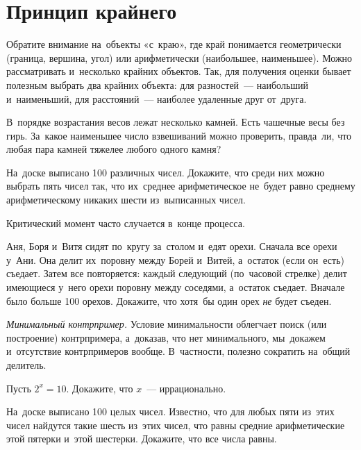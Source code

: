 
\section*{Принцип крайнего}



Обратите внимание на~объекты «с~краю», где край понимается геометрически
(граница, вершина, угол) или арифметически (наибольшее, наименьшее).
Можно рассматривать и~несколько крайних объектов.
Так, для получения оценки бывает полезным выбрать два крайних объекта: для
разностей~— наибольший и~наименьший, для расстояний~— наиболее удаленные
друг от~друга.

\begin{problems}

\item
В~порядке возрастания весов лежат несколько камней.
Есть чашечные весы без гирь.
За~какое наименьшее число взвешиваний можно проверить, правда~ли, что любая пара
камней тяжелее любого одного камня?

\item
На~доске выписано 100 различных чисел.
Докажите, что среди них можно выбрать пять чисел так, что их~среднее
арифметическое не~будет равно среднему арифметическому никаких шести
из~выписанных чисел.

\end{problems}

Критический момент часто случается в~конце процесса.

\begin{problems}

\item
Аня, Боря и~Витя сидят по~кругу за~столом и~едят орехи.
Сначала все орехи у~Ани.
Она делит их~поровну между Борей и~Витей, а~остаток (если он~есть) съедает.
Затем все повторяется: каждый следующий (по~часовой стрелке) делит имеющиеся
у~него орехи поровну между соседями, а~остаток съедает.
Вначале было больше 100 орехов.
Докажите, что хотя~бы один орех \emph{не} будет съеден.

\end{problems}

\emph{Минимальный контрпример.}
Условие минимальности облегчает поиск (или построение) контрпримера, а~доказав,
что нет минимального, мы~докажем и~отсутствие контрпримеров вообще.
В~частности, полезно сократить на~общий делитель.

\begin{problems}

\item
Пусть $2^x = 10$.
Докажите, что $x$~— иррационально.

\item
На~доске выписано 100 целых чисел.
Известно, что для любых пяти из~этих чисел найдутся такие шесть из~этих чисел,
что равны средние арифметические этой пятерки и~этой шестерки.
Докажите, что все числа равны.

\end{problems}

